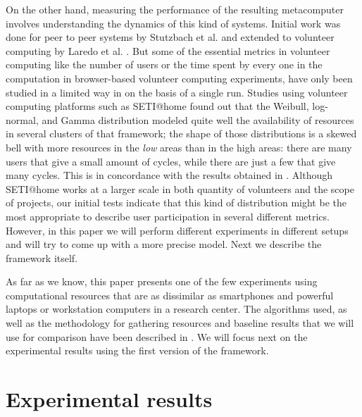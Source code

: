 \documentclass[journal,onecolumn]{IEEEtran}
\begin{document}
On the other hand, measuring the performance of the resulting metacomputer
involves understanding the dynamics of this kind of systems. Initial
work was done for peer to peer systems by Stutzbach et
al. \cite{stutzbach2006understanding} and extended to volunteer
computing by Laredo et al. \cite{churn08,laredo2008rcp}. 
But some of the essential metrics in volunteer computing like the
number of users or the time spent by every one in the
computation in browser-based volunteer computing experiments, have
only been studied in a limited way in 
\cite{DBLP:journals/gpem/LaredoBGVAGF14} on the basis of a single
run. Studies using volunteer computing platforms such as SETI@home
\cite{javadi2009mining} found out that the Weibull, log-normal, and
Gamma distribution 
modeled quite well the availability of resources in several clusters
of that framework; the shape of those distributions is a skewed bell
with more resources in the {\em low} areas than in the high areas:
there are many users that give a small amount of cycles, while there
are just a few that give many cycles. This is in concordance with the
results obtained in \cite{agajaj}. Although SETI@home works
at a larger scale in both quantity of volunteers and the scope of projects, 
our initial tests indicate that
this kind of distribution might be the most appropriate to describe
user participation in several different metrics. However, in this
paper we will perform different experiments in different setups and
will try to come up with a more precise model. Next we describe the
framework itself.


As far as we know, this paper presents one of the few experiments using %
computational resources that are as dissimilar as smartphones and
powerful laptops 
or workstation computers in a research center. 
The algorithms used, as well as the methodology 
for gathering resources and baseline results that we will use for
comparison have been described in
\cite{2016arXiv160101607M}. We will focus next on the experimental
results using the first version of the framework. 


\section{Experimental results}
\label{sec:exp1}
\end{document}
